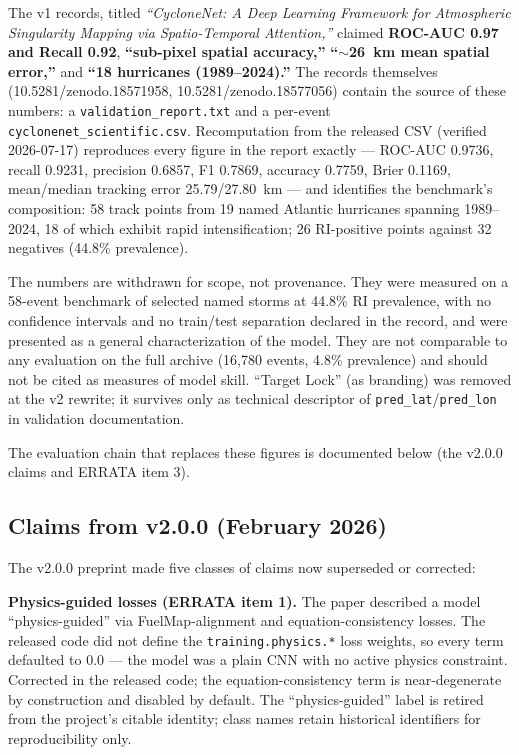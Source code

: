 \documentclass[11pt]{article}
\begin{document}
The v1 records, titled \emph{``CycloneNet: A Deep Learning Framework for
Atmospheric Singularity Mapping via Spatio-Temporal Attention,''} claimed
\textbf{ROC-AUC 0.97 and Recall 0.92}, \textbf{``sub-pixel spatial
accuracy,''} \textbf{``$\sim$26~km mean spatial error,''} and \textbf{``18
hurricanes (1989--2024).''} The records themselves (10.5281/zenodo.18571958,
10.5281/zenodo.18577056) contain the source of these numbers: a
\texttt{validation\_report.txt} and a per-event
\texttt{cyclonenet\_scientific.csv}. Recomputation from the released CSV
(verified 2026-07-17) reproduces every figure in the report exactly ---
ROC-AUC 0.9736, recall 0.9231, precision 0.6857, F1 0.7869, accuracy 0.7759,
Brier 0.1169, mean/median tracking error 25.79/27.80~km --- and identifies
the benchmark's composition: 58 track points from 19 named Atlantic
hurricanes spanning 1989--2024, 18 of which exhibit rapid intensification;
26 RI-positive points against 32 negatives (44.8\% prevalence).

The numbers are withdrawn for scope, not provenance. They were measured on a
58-event benchmark of selected named storms at 44.8\% RI prevalence, with no
confidence intervals and no train/test separation declared in the record, and
were presented as a general characterization of the model. They are not
comparable to any evaluation on the full archive (16{,}780 events, 4.8\%
prevalence) and should not be cited as measures of model skill. ``Target
Lock'' (as branding) was removed at the v2 rewrite; it survives only as
technical descriptor of \texttt{pred\_lat}/\texttt{pred\_lon} in validation
documentation.

The evaluation chain that replaces these figures is documented below (the
v2.0.0 claims and ERRATA item 3).

\subsection{Claims from v2.0.0 (February 2026)}

The v2.0.0 preprint made five classes of claims now superseded or corrected:

\textbf{Physics-guided losses (ERRATA item 1).} The paper described a model
``physics-guided'' via FuelMap-alignment and equation-consistency losses. The
released code did not define the \texttt{training.physics.*} loss weights, so
every term defaulted to 0.0 --- the model was a plain CNN with no active
physics constraint. Corrected in the released code; the equation-consistency
term is near-degenerate by construction and disabled by default. The
``physics-guided'' label is retired from the project's citable identity; class
names retain historical identifiers for reproducibility only.
\end{document}
